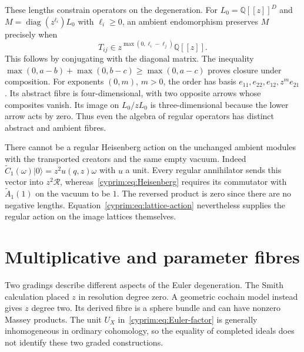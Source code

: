 These lengths constrain operators on the degeneration.
For $L_0=\mathbb Q[[z]]^D$ and
$M=\operatorname{diag}(z^{\ell_i})L_0$ with $\ell_i\ge0$, an ambient
endomorphism preserves $M$ precisely when
\begin{equation}\label{cyprim:eq:simultaneous-order}
 T_{ij}\in z^{\max(0,\ell_i-\ell_j)}\mathbb Q[[z]].
\end{equation}
This follows by conjugating with the diagonal matrix.
The inequality
$\max(0,a-b)+\max(0,b-c)\ge\max(0,a-c)$ proves closure
under composition. For exponents $(0,m)$, $m>0$, the
order has basis $e_{11},e_{22},e_{12},z^me_{21}$.
Its abstract fibre is four-dimensional, with two
opposite arrows whose composites vanish. Its image
on $L_0/zL_0$ is three-dimensional because the lower
arrow acts by zero. Thus even the algebra of regular
operators has distinct abstract and ambient fibres.

There cannot be a regular Heisenberg action on the
unchanged ambient modules with the transported creators
and the same empty vacuum. Indeed
$\widetilde C_1(\omega)|0\rangle
=z^2u(q,z)\omega$ with $u$ a unit. Every regular
annihilator sends this vector into $z^2\mathcal R$,
whereas~\eqref{cyprim:eq:Heisenberg} requires its
commutator with $\widetilde A_1(1)$ on the vacuum to
be $1$. The reversed product is zero since there are
no negative lengths. Equation~\eqref{cyprim:eq:lattice-action}
nevertheless supplies the regular action on the image
lattices themselves.

\section{Multiplicative and parameter fibres}
\label{cyprim:sec:higher-fibres}

Two gradings describe different aspects of the Euler
degeneration. The Smith calculation placed $z$ in
resolution degree zero. A geometric cochain model
instead gives $z$ degree two. Its derived fibre is a
sphere bundle and can have nonzero Massey products.
The unit $U_X$ in~\eqref{cyprim:eq:Euler-factor} is
generally inhomogeneous in ordinary cohomology, so
the equality of completed ideals does not identify
these two graded constructions.

